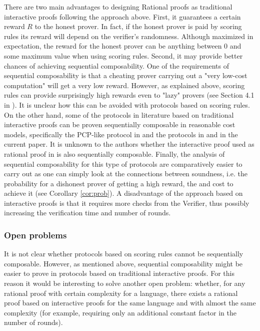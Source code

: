 There are two main advantages to designing Rational proofs as traditional interactive proofs following the approach above. First, it guarantees a certain reward $R$ to the honest prover. In fact, if the honest prover is paid by scoring rules its reward will depend on the verifier's randomness. Although maximized in expectation, the reward for the honest prover can be anything between 0 and some maximum value when using scoring rules. Second, it may provide better chances of achieving sequential composability. One of the requirements of sequential composability is that a cheating prover carrying out a "very low-cost computation" will get a very low reward. However, as explained above, scoring rules can provide surprisingly high rewards even to "lazy" provers (see Section 4.1 in \cite{cg15}). It is unclear how this can be avoided with protocols based on scoring rules. On the other hand, some of the protocols in literature based on traditional interactive proofs can be proven sequentially composable in reasonable cost models, specifically the PCP-like protocol in \cite{am1} and the protocols in \cite{cg15} and in the current paper. It is unknown to the authors whether the interactive proof used as rational proof in \cite{chen2016rational} is also sequentially composable. Finally, the analysis of sequential composability for this type of protocols are comparatively easier to carry out as one can simply look at the connections between soundness, i.e. the probability for a dishonest prover of getting a high reward, the and cost to achieve it (see Corollary \ref{cor:prob}).
A disadvantage of the approach based on interactive proofs is that it requires more checks from the Verifier, thus possibly increasing the verification time and number of rounds.

\subsubsection{Open problems}
It is not clear whether protocols based on scoring rules cannot be  sequentially composable. However, as mentioned above, sequential composability might be easier to prove in protocols based on traditional interactive proofs. For this reason it would be interesting to solve another open problem: whether, for any rational proof with certain complexity for a language, there exists a rational proof based on interactive proofs for the same language and with almost the same complexity (for example, requiring only an additional constant factor in the number of rounds). 
